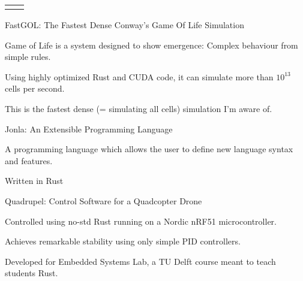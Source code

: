 \documentclass[11pt, a4paper]{awesome-cv}
\begin{document}
\begin{paracol}{2}
	\setlength{\tabcolsep}{0pt}
	\begin{tabular*}{\linewidth}{L{\linewidth / 2} L{\linewidth / 2}}
	\paragraphstyle {} &
	\paragraphstyle {} \\
	\end{tabular*}
	
	
	\ultracompactcventry
	{FastGOL: The Fastest Dense Conway's Game Of Life Simulation}
	{\begin{cvitems}
		\item Game of Life is a system designed to show emergence: Complex behaviour from simple rules.
		\item Using highly optimized Rust and CUDA code, it can simulate more than $10^{13}$ cells per second.
		\item This is the fastest dense (= simulating all cells) simulation I'm aware of.
	\end{cvitems}}
	
	\ultracompactcventry
	{Jonla: An Extensible Programming Language}
	{\begin{cvitems}
		\item A programming language which allows the user to define new language syntax and features.
		\item Written in Rust
	\end{cvitems}}
	
	\ultracompactcventry
	{Quadrupel: Control Software for a Quadcopter Drone}
	{\begin{cvitems}
		\item Controlled using no-std Rust running on a Nordic nRF51 microcontroller.
		\item Achieves remarkable stability using only simple PID controllers.
		\item Developed for Embedded Systems Lab, a TU Delft course meant to teach students Rust.
	\end{cvitems}}
	

\end{paracol}
\end{document}
